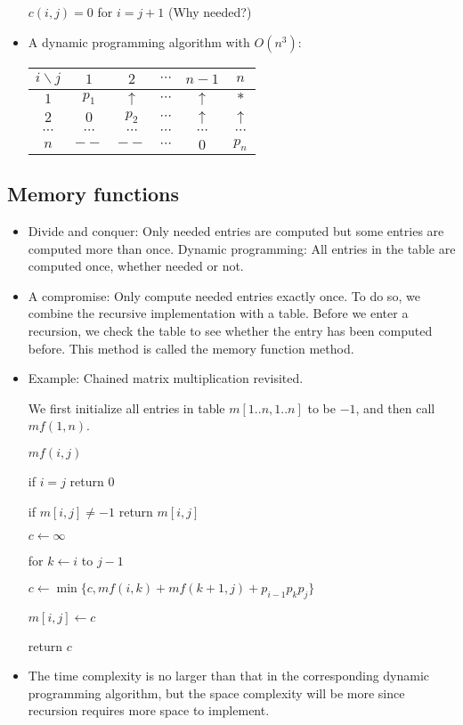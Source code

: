 \documentclass{article}
\begin{document}
\begin{itemize}
$c(i,j)=0$ for $i=j+1$ (Why needed?)

\item A dynamic programming algorithm with $O(n^3)$:

\begin{center}
\begin{tabular}{c|c|c|c|c|c}
$i\backslash j$ & $1$ & $2$ & $\cdots$ & $n-1$ & $n$\\\hline
$1$ & $p_1$ & $\uparrow$ & $\cdots$ & $\uparrow$ & $*$\\
$2$ & $0$ & $p_2$ & $\cdots$ & $\uparrow$ & $\uparrow$\\
$\cdots$ & $\cdots$ & $\cdots$ & $\cdots$ & $\cdots$ & $\cdots$\\
$n$ & $--$ & $--$ & $\cdots$ & $0$ & $p_n$\\
\end{tabular}
\end{center}
 
\end{itemize}

\subsection{Memory functions}


\begin{itemize}

\item Divide and conquer: Only needed entries are 
computed but some entries are computed more than once.
Dynamic programming: All entries
in the table are computed once, whether needed or not.

\item A compromise: Only compute needed entries exactly once.
To do so, we combine the recursive implementation with a
table. Before we enter a recursion, we check the table to
see whether the entry has been computed before. This method
is called the memory function method.

\item Example: Chained matrix multiplication revisited.

We first initialize all entries in table $m[1..n,1..n]$ to be $-1$,
and then call $mf(1,n)$.

$mf(i,j)$

\qquad if $i=j$ return 0

\qquad if $m[i,j]\not=-1$ return $m[i,j]$

\qquad $c\leftarrow\infty$

\qquad for $k\leftarrow i$ to $j-1$

\qquad\qquad $c\leftarrow\min\{c, mf(i,k)+mf(k+1,j)+p_{i-1}p_kp_j\}$

\qquad $m[i,j]\leftarrow c$

\qquad return $c$

\item The time complexity is no larger than that in the
corresponding dynamic programming algorithm, but the space
complexity will be more since recursion requires more space 
to implement.

\end{itemize}
\end{document}
